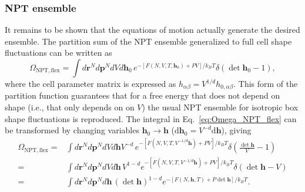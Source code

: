 \documentclass[12pt,letter]{article}
\renewcommand{\vec}[1]{\mathbf{#1}}
\begin{document}
\subsubsection{NPT ensemble}
It remains to be shown that the equations of motion actually generate the desired ensemble. The
partition sum of the NPT ensemble generalized to full cell shape fluctuations can be written as
\begin{equation}
\Omega_{\mathrm{NPT,flex}} = \int d\vec r^N d\vec p^N dV d\vec h_0\,
e^{-\left[F(N,V,T,\vec h_0)+PV\right]/k_B T} \delta(\det \vec h_0 - 1),
\label{eq:Omega_NPT_flex}
\end{equation}
where the cell parameter matrix is expressed as $h_{\alpha\beta} = V^{1/d}
h_{0,\alpha\beta}$.  This form of the partition function guarantees that
for a free energy that does not depend on shape (i.e., that only depends on
on $V$) the usual NPT ensemble for isotropic box shape fluctuations is reproduced.  The integral in
Eq.~\eqref{eq:Omega_NPT_flex} can be transformed by changing
variables $\vec h_0 \to \vec h$ ($\mathrm d\vec h_0 =V^{-d} \mathrm d\vec h$), giving
\begin{align}
\Omega_{\mathrm{NPT,flex}} =&  \int d\vec r^N d\vec p^N dV d\vec h
V^{-d}\, e^{-\left[F(N,V,T,V^{-1/d} \vec h)+PV\right]/k_B T} \delta\left(\frac{\det\vec h}{V}-1\right)\\
=&\int d\vec r^N d\vec p^N dV d\vec h
\, V^{1-d}e^{-\left[F(N,V,T,V^{-1/d} \vec h)+PV\right]/k_B T} \delta(\det \vec h- V)\\
=&\int d\vec r^N d\vec p^N d\vec h\, (\det \vec h)^{1-d}e^{-\left[F(N,\vec h,T)+P \det\vec h\right]/k_B T}.
\label{eq:Omega_NPT_flex_2}
\end{align}
\end{document}

